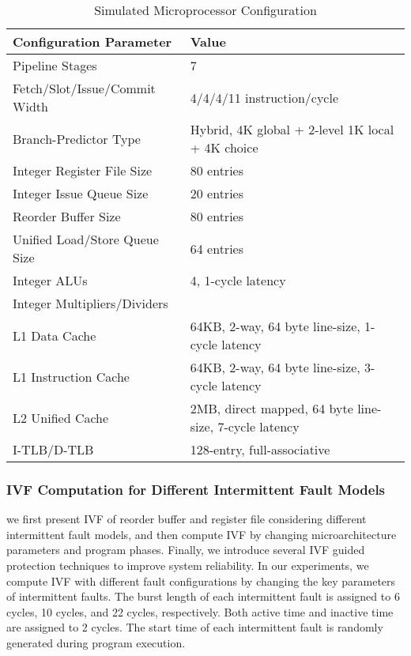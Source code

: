 \begin{table} 
    \centering
    \caption{Simulated Microprocessor Configuration}
    \begin{tabular}{@{}l|l@{}}
        \toprule
        Configuration Parameter & Value \\ \midrule
        Pipeline Stages & 7 \\
        Fetch/Slot/Issue/Commit Width & 4/4/4/11 instruction/cycle \\
        Branch-Predictor Type & Hybrid, 4K global + 2-level 1K local + 4K choice \\
        Integer Register File Size & 80 entries  \\
        Integer Issue Queue Size & 20 entries \\
        Reorder Buffer Size & 80 entries \\
        Unified Load/Store Queue Size & 64 entries \\
        Integer ALUs & 4, 1-cycle latency \\
        Integer Multipliers/Dividers &  \\
        L1 Data Cache & 64KB, 2-way, 64 byte line-size, 1-cycle latency \\
        L1 Instruction Cache & 64KB, 2-way, 64 byte line-size, 3-cycle latency \\
        L2 Unified Cache & 2MB, direct mapped, 64 byte line-size, 7-cycle latency \\
        I-TLB/D-TLB & 128-entry, full-associative \\ \bottomrule
    \end{tabular}
    \label{tab:sim-config}
\end{table}

\subsubsection{IVF Computation for Different Intermittent Fault Models}
we first present IVF of reorder buffer and register file considering different intermittent fault models, and then compute IVF by changing microarchitecture parameters and program phases. Finally, we introduce several IVF guided protection techniques to improve system reliability. In our experiments, we compute IVF with different fault configurations by changing the key parameters of intermittent faults. The burst length of each intermittent fault is assigned to 6 cycles, 10 cycles, and 22 cycles, respectively. Both active time and inactive time are assigned to 2 cycles. The start time of each intermittent fault is randomly generated during program execution.

